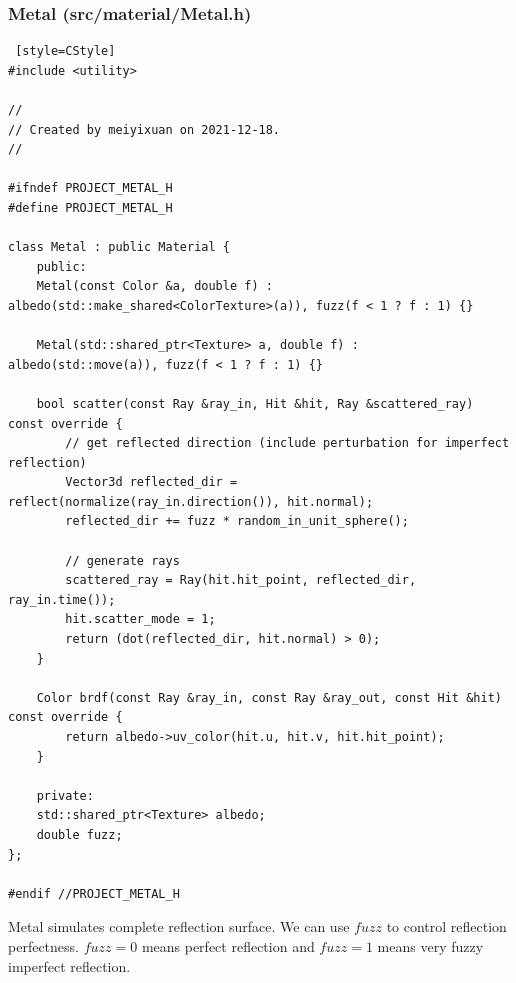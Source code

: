 \documentclass[utf8]{article}
\begin{document}
\subsubsection{Metal (src/material/Metal.h)}
\begin{lstlisting} [style=CStyle]
#include <utility>

//
// Created by meiyixuan on 2021-12-18.
//

#ifndef PROJECT_METAL_H
#define PROJECT_METAL_H

class Metal : public Material {
	public:
	Metal(const Color &a, double f) : albedo(std::make_shared<ColorTexture>(a)), fuzz(f < 1 ? f : 1) {}
	
	Metal(std::shared_ptr<Texture> a, double f) : albedo(std::move(a)), fuzz(f < 1 ? f : 1) {}
	
	bool scatter(const Ray &ray_in, Hit &hit, Ray &scattered_ray) const override {
		// get reflected direction (include perturbation for imperfect reflection)
		Vector3d reflected_dir = reflect(normalize(ray_in.direction()), hit.normal);
		reflected_dir += fuzz * random_in_unit_sphere();
		
		// generate rays
		scattered_ray = Ray(hit.hit_point, reflected_dir, ray_in.time());
		hit.scatter_mode = 1;
		return (dot(reflected_dir, hit.normal) > 0);
	}
	
	Color brdf(const Ray &ray_in, const Ray &ray_out, const Hit &hit) const override {
		return albedo->uv_color(hit.u, hit.v, hit.hit_point);
	}
	
	private:
	std::shared_ptr<Texture> albedo;
	double fuzz;
};

#endif //PROJECT_METAL_H

\end{lstlisting}
Metal simulates complete reflection surface. We can use $fuzz$ to control reflection perfectness. $fuzz=0$ means perfect reflection and $fuzz=1$ means very fuzzy imperfect reflection.
\end{document}

